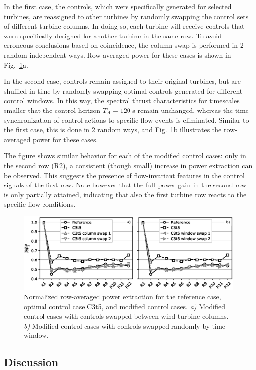 \documentclass[wes, manuscript]{copernicus}
\begin{document}
In the first case, the controls, which were specifically generated for selected turbines, are reassigned to other turbines by randomly swapping the control sets of different turbine columns. In doing so, each turbine will receive controls that were specifically designed for another turbine in the same row. To avoid erroneous conclusions based on coincidence, the column swap is performed in 2 random independent ways. Row-averaged power for these cases is shown in Fig.~\ref{fig:scrambled}a. 

In the second case, controls remain assigned to their original turbines, but are shuffled in time by randomly swapping optimal controls generated for different control windows. In this way, the spectral thrust characteristics for timescales smaller that the control horizon $T_A = 120$ s remain unchanged, whereas the time synchronization of control actions to specific flow events is eliminated. Similar to the first case, this is done in 2 random ways, and Fig.~\ref{fig:scrambled}b illustrates the row-averaged power for these cases.

The figure shows similar behavior for each of the modified control cases: only in the second row (R2), a consistent (though small) increase in power extraction can be observed. This suggests the presence of flow-invariant	features in the control signals of the first row. Note however that the full power gain in the second row is only partially attained, indicating that also the first turbine row reacts to the specific flow conditions.  

\begin{figure}
	\includegraphics[width=\textwidth]{scrambled.eps}
	\caption{Normalized row-averaged power extraction for the reference case, optimal control case C3t5, and modified control cases. \emph{a)} Modified control cases with controls swapped between wind-turbine columns. \emph{b)} Modified control cases with controls swapped randomly by time window. \label{fig:scrambled}}
\end{figure}

\subsection{Discussion}\label{sec:analysis_discussion}
\end{document}
